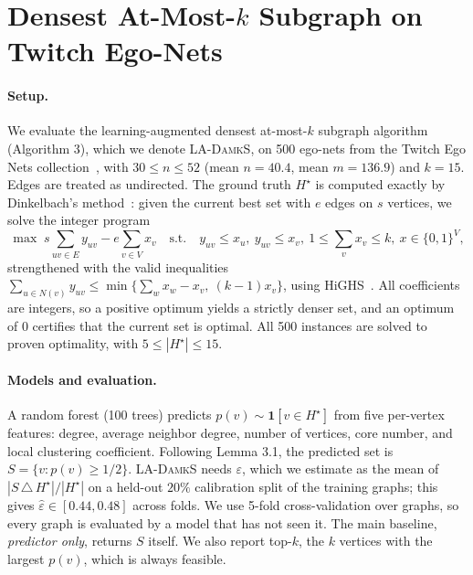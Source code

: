 
\section{Densest At-Most-$k$ Subgraph on Twitch Ego-Nets}
\label{sec:exp-damks}

\paragraph{Setup.} We evaluate the learning-augmented densest at-most-$k$ subgraph
algorithm (Algorithm 3), which we denote \textsc{LA-DamkS}, on 500 ego-nets from the Twitch Ego Nets
collection~\cite{karateclub2020}, with $30 \le n \le 52$ (mean $n = 40.4$, mean $m = 136.9$)
and $k = 15$. Edges are treated as undirected. The ground truth $H^\star$ is computed exactly by
Dinkelbach's method~\cite{dinkelbach1967}: given the current best set with $e$ edges on $s$
vertices, we solve the integer program
\[
\max\; s\textstyle\sum_{uv\in E} y_{uv} - e\sum_{v\in V} x_v
\quad\text{s.t.}\quad y_{uv}\le x_u,\ y_{uv}\le x_v,\ 1\le\textstyle\sum_v x_v\le k,\ x\in\{0,1\}^V,
\]
strengthened with the valid inequalities
$\sum_{u\in N(v)} y_{uv}\le \min\{\sum_w x_w - x_v,\ (k-1)x_v\}$, using HiGHS~\cite{highs}.
All coefficients are integers, so a positive optimum yields a strictly denser set, and an optimum
of $0$ certifies that the current set is optimal. All 500 instances are solved to proven
optimality, with $5 \le |H^\star| \le 15$.

\paragraph{Models and evaluation.} A random forest (100 trees) predicts
$p(v) \sim \mathbf{1}[v\in H^\star]$ from five per-vertex features: degree, average
neighbor degree, number of vertices, core number, and local clustering coefficient.
Following Lemma 3.1, the predicted set is $S = \{v : p(v)\ge 1/2\}$. \textsc{LA-DamkS} needs
$\varepsilon$, which we estimate as the mean of $|S\,\triangle\,H^\star|/|H^\star|$ on a held-out
$20\%$ calibration split of the training graphs; this gives
$\hat\varepsilon\in[0.44, 0.48]$ across folds. We use 5-fold cross-validation over
graphs, so every graph is evaluated by a model that has not seen it. The main baseline,
\emph{predictor only}, returns $S$ itself. We also report top-$k$, the $k$ vertices with the
largest $p(v)$, which is always feasible.

